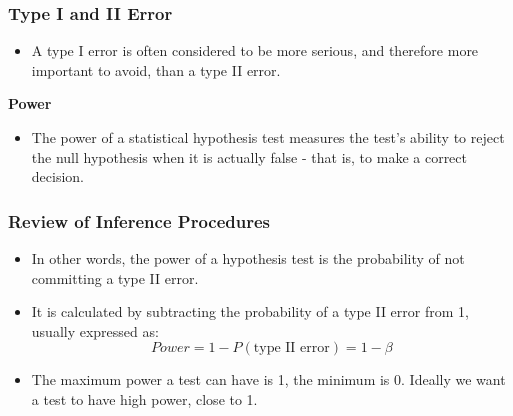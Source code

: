 \documentclass{beamer}
\begin{document}
\begin{frame}
\frametitle{Type I and II Error}
\large
\begin{itemize}
\item A type I error is often considered to be more serious, and therefore
more important to avoid, than a type II error. 
\end{itemize}
\textbf{Power}
\begin{itemize}
	\item The power of a statistical hypothesis test measures the test's ability
to reject the null hypothesis when it is actually false - that is, to
make a correct decision.
\end{itemize}
\end{frame}
\begin{frame}
	\frametitle{Review of Inference Procedures}
	\large
\begin{itemize}
	\item 

In other words, the power of a hypothesis test is the probability of
not committing a type II error. 
\item It is calculated by subtracting the
probability of a type II error from 1, usually expressed as:
\[Power = 1 - P(\mbox{type II error}) = 1- \beta\]
\item The maximum power a test can have is 1, the minimum is 0. Ideally
we want a test to have high power, close to 1.
\end{itemize}
\end{frame}
\end{document}
